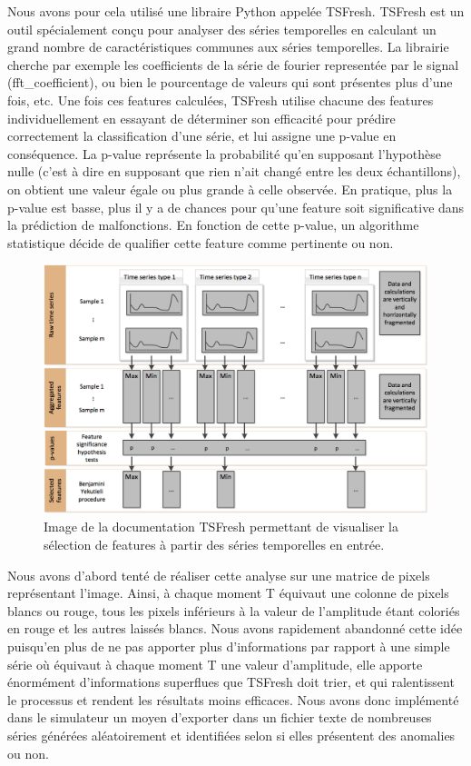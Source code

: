 \documentclass[french]{article}
\theoremstyle{mytheoremstyle}
\theoremstyle{mytheoremstyle}
\theoremstyle{myproblemstyle}
\begin{document}
        Nous avons pour cela utilisé une libraire Python appelée TSFresh. TSFresh est un outil spécialement conçu pour analyser des séries temporelles en calculant un grand nombre de caractéristiques communes aux séries temporelles\cite{tsfreshfeatures}. La librairie cherche par exemple les coefficients de la série de fourier representée par le signal (fft\_coefficient), ou bien le pourcentage de valeurs qui sont présentes plus d'une fois, etc. Une fois ces features calculées, TSFresh utilise chacune des features individuellement en essayant de déterminer son efficacité pour prédire correctement la classification d'une série, et lui assigne une p-value en conséquence. La p-value représente la probabilité qu'en supposant l'hypothèse nulle (c'est à dire en supposant que rien n'ait changé entre les deux échantillons), on obtient une valeur égale ou plus grande à celle observée. En pratique, plus la p-value est basse, plus il y a de chances pour qu'une feature soit significative dans la prédiction de malfonctions. En fonction de cette p-value, un algorithme statistique décide de qualifier cette feature comme pertinente ou non.
        
        \begin{figure}[H]
            \centering
            \includegraphics[width=.8\textwidth]{images/features_extraction.png}
            \caption{Image de la documentation TSFresh permettant de visualiser la sélection de features à partir des séries temporelles en entrée.}
            \label{}
        \end{figure}
        
      
        Nous avons d'abord tenté de réaliser cette analyse sur une matrice de pixels représentant l'image. Ainsi, à chaque moment T équivaut une colonne de pixels blancs ou rouge, tous les pixels inférieurs à la valeur de l'amplitude étant coloriés en rouge et les autres laissés blancs. Nous avons rapidement abandonné cette idée puisqu'en plus de ne pas apporter plus d'informations par rapport à une simple série où équivaut à chaque moment T une valeur d'amplitude, elle apporte énormément d'informations superflues que TSFresh doit trier, et qui ralentissent le processus et rendent les résultats moins efficaces. Nous avons donc implémenté dans le simulateur un moyen d'exporter dans un fichier texte de nombreuses séries générées aléatoirement et identifiées selon si elles présentent des anomalies ou non.
        
\end{document}
